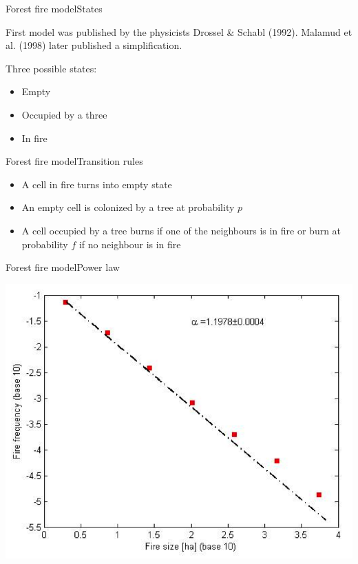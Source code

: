\documentclass{eecslides}
\begin{document}

	\begin{frame}{Forest fire model}{States}
		
	First model was published by the physicists Drossel \& Schabl (1992). Malamud et al. (1998) later published a simplification.

	Three possible states: 
		\begin{itemize}
			\item Empty
			\item Occupied by a three
			\item In fire
		\end{itemize}
	\end{frame}


	\begin{frame}{Forest fire model}{Transition rules}

		\begin{itemize}
			\item A cell in fire turns into empty state
			\item An empty cell is colonized by a tree at probability $p$
			\item A cell occupied by a tree burns if one of the neighbours is in fire or burn at probability $f$ if no neighbour is in fire
		\end{itemize}
	\end{frame}


	\begin{frame}{Forest fire model}{Power law}
		\begin{center}
			\includegraphics[height=0.7\textheight]{fire_size}
		\end{center}
	\end{frame}
\end{document}
